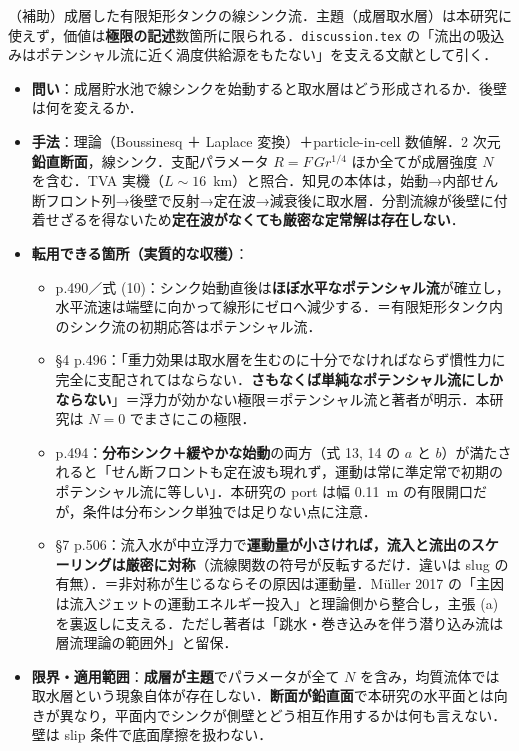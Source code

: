 \documentclass[11pt]{jsarticle}
\newcommand{\litref}[1]{{\large\bfseries\color{citecolor}#1}}
\begin{document}
\noindent\litref{Imberger et al. (1976)}\quad（補助）成層した有限矩形タンクの線シンク流．主題（成層取水層）は本研究に使えず，価値は\textbf{極限の記述}数箇所に限られる．\texttt{discussion.tex} の「流出の吸込みはポテンシャル流に近く渦度供給源をもたない」を支える文献として引く．
\begin{itemize}
  \item \textbf{問い}：成層貯水池で線シンクを始動すると取水層はどう形成されるか．後壁は何を変えるか．
  \item \textbf{手法}：理論（Boussinesq ＋ Laplace 変換）＋particle-in-cell 数値解．2 次元\textbf{鉛直断面}，線シンク．支配パラメータ $R = F\,Gr^{1/4}$ ほか全てが成層強度 $N$ を含む．TVA 実機（$L \sim 16$~km）と照合．知見の本体は，始動→内部せん断フロント列→後壁で反射→定在波→減衰後に取水層．分割流線が後壁に付着せざるを得ないため\textbf{定在波がなくても厳密な定常解は存在しない}．
  \item \textbf{転用できる箇所（実質的な収穫）}：
  \begin{itemize}
    \item p.490／式 (10)：シンク始動直後は\textbf{ほぼ水平なポテンシャル流}が確立し，水平流速は端壁に向かって線形にゼロへ減少する．＝有限矩形タンク内のシンク流の初期応答はポテンシャル流．
    \item §4 p.496：「重力効果は取水層を生むのに十分でなければならず慣性力に完全に支配されてはならない．\textbf{さもなくば単純なポテンシャル流にしかならない}」＝浮力が効かない極限＝ポテンシャル流と著者が明示．本研究は $N = 0$ でまさにこの極限．
    \item p.494：\textbf{分布シンク＋緩やかな始動}の両方（式 13, 14 の $a$ と $b$）が満たされると「せん断フロントも定在波も現れず，運動は常に準定常で初期のポテンシャル流に等しい」．本研究の port は幅 0.11~m の有限開口だが，条件は分布シンク単独では足りない点に注意．
    \item §7 p.506：流入水が中立浮力で\textbf{運動量が小さければ，流入と流出のスケーリングは厳密に対称}（流線関数の符号が反転するだけ．違いは slug の有無）．＝非対称が生じるならその原因は運動量．M\"uller 2017 の「主因は流入ジェットの運動エネルギー投入」と理論側から整合し，主張 (a) を裏返しに支える．ただし著者は「跳水・巻き込みを伴う潜り込み流は層流理論の範囲外」と留保．
  \end{itemize}
  \item \textbf{限界・適用範囲}：\textbf{成層が主題}でパラメータが全て $N$ を含み，均質流体では取水層という現象自体が存在しない．\textbf{断面が鉛直面}で本研究の水平面とは向きが異なり，平面内でシンクが側壁とどう相互作用するかは何も言えない．壁は slip 条件で底面摩擦を扱わない．

\end{itemize}
\end{document}

